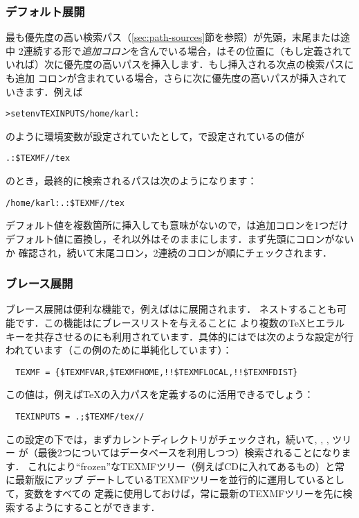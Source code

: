 \documentclass[uplatex,dvipdfmx,tombow]{jsarticle}
\begin{document}
\subsubsection{デフォルト展開}
\label{sec:default-expansion}

最も優先度の高い検索パス（\ref{sec:path-sources}節を参照）が先頭，末尾または途中
2連続する形で\emph{追加コロン}を含んでいる場合，\KPS はその位置に（もし定義されて
いれば）次に優先度の高いパスを挿入します．もし挿入される次点の検索パスにも追加
コロンが含まれている場合，さらに次に優先度の高いパスが挿入されていきます．例えば
%
\begin{alltt}
> setenv TEXINPUTS /home/karl:
\end{alltt}
%
のように環境変数が設定されていたとして，で設定されているの値が
%
\begin{alltt}
  .:\$TEXMF//tex
\end{alltt}
%
のとき，最終的に検索されるパスは次のようになります：
%
\begin{alltt}
  /home/karl:.:\$TEXMF//tex
\end{alltt}
デフォルト値を複数箇所に挿入しても意味がないので，\KPS は追加コロンを1つだけ
デフォルト値に置換し，それ以外はそのままにします．まず先頭にコロンがないか
確認され，続いて末尾コロン，2連続のコロンが順にチェックされます．

\subsubsection{ブレース展開}
\label{sec:brace-expansion}

ブレース展開は便利な機能で，例えばはに展開されます．
ネストすることも可能です．この機能はにブレースリストを与えることに
より複数の\TeX ヒエラルキーを共存させるのにも利用されています．具体的にはでは次のような設定が行われています（この例のために単純化しています）：
%
\begin{verbatim}
  TEXMF = {$TEXMFVAR,$TEXMFHOME,!!$TEXMFLOCAL,!!$TEXMFDIST}
\end{verbatim}
%
この値は，例えば\TeX の入力パスを定義するのに活用できるでしょう：
%
\begin{verbatim}
  TEXINPUTS = .;$TEXMF/tex//
\end{verbatim}
%
この設定の下では，まずカレントディレクトリがチェックされ，続いて, , , ツリー
が（最後2つについてはデータベースを利用しつつ）検索されることになります．
これにより``frozen''なTEXMFツリー（例えばCDに入れてあるもの）と常に最新版にアップ
デートしているTEXMFツリーを並行的に運用しているとして，変数をすべての
定義に使用しておけば，常に最新のTEXMFツリーを先に検索するようにすることができます．
\end{document}
